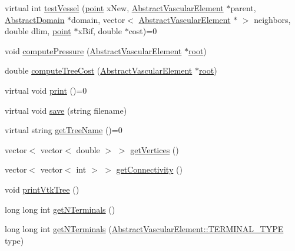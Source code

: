 \begin{DoxyCompactItemize}
\item 
virtual int \hyperlink{class_abstract_object_c_c_o_tree_a7279cc7eaa7466bc86fa83508df4358a}{test\+Vessel} (\hyperlink{structpoint}{point} x\+New, \hyperlink{class_abstract_vascular_element}{Abstract\+Vascular\+Element} $\ast$parent, \hyperlink{class_abstract_domain}{Abstract\+Domain} $\ast$domain, vector$<$ \hyperlink{class_abstract_vascular_element}{Abstract\+Vascular\+Element} $\ast$ $>$ neighbors, double dlim, \hyperlink{structpoint}{point} $\ast$x\+Bif, double $\ast$cost)=0
\item 
void \hyperlink{class_abstract_object_c_c_o_tree_ae04ad6b8ba131dc1e9ddda324045548d}{compute\+Pressure} (\hyperlink{class_abstract_vascular_element}{Abstract\+Vascular\+Element} $\ast$\hyperlink{class_abstract_object_c_c_o_tree_ae1b17938ad34d92629915159c49bb89a}{root})
\item 
double \hyperlink{class_abstract_object_c_c_o_tree_abf94482b3937739dd83ec4c748e1adbf}{compute\+Tree\+Cost} (\hyperlink{class_abstract_vascular_element}{Abstract\+Vascular\+Element} $\ast$\hyperlink{class_abstract_object_c_c_o_tree_ae1b17938ad34d92629915159c49bb89a}{root})
\item 
virtual void \hyperlink{class_abstract_object_c_c_o_tree_a6815c1d167caf524cc81faecffed65e7}{print} ()=0
\item 
virtual void \hyperlink{class_abstract_object_c_c_o_tree_a11f4904c4aafdd748cc4b93f9b78116c}{save} (string filename)
\item 
virtual string \hyperlink{class_abstract_object_c_c_o_tree_a25cc167a1c8aae7edc8158683a668647}{get\+Tree\+Name} ()=0
\item 
vector$<$ vector$<$ double $>$ $>$ \hyperlink{class_abstract_object_c_c_o_tree_a1f90fe393e3bd7f6f4a6ae7195827f17}{get\+Vertices} ()
\item 
vector$<$ vector$<$ int $>$ $>$ \hyperlink{class_abstract_object_c_c_o_tree_a40659166aaf9843ddc6ac4c7ba7d9505}{get\+Connectivity} ()
\item 
void \hyperlink{class_abstract_object_c_c_o_tree_af8c442bdb65922511391f7f0e3b98b18}{print\+Vtk\+Tree} ()
\item 
long long int \hyperlink{class_abstract_object_c_c_o_tree_ae126ccaccbb13167161ddfadd4353c17}{get\+N\+Terminals} ()
\item 
long long int \hyperlink{class_abstract_object_c_c_o_tree_aeef8f145bcb5ebff39b74279f4f2350a}{get\+N\+Terminals} (\hyperlink{class_abstract_vascular_element_a9c7d6ae9fe8c220ddad143208b0a5a11}{Abstract\+Vascular\+Element\+::\+T\+E\+R\+M\+I\+N\+A\+L\+\_\+\+T\+Y\+PE} type)

\end{DoxyCompactItemize}
